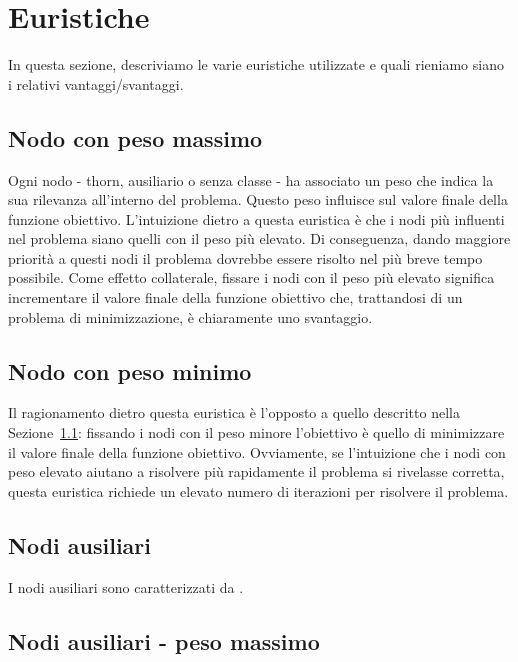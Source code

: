 \section{Euristiche}\label{sec:euristiche}

In questa sezione, descriviamo le varie euristiche utilizzate e quali rieniamo siano i relativi vantaggi/svantaggi.

\subsection{Nodo con peso massimo}\label{subsec:nodo_peso_massimo}

Ogni nodo - thorn, ausiliario o senza classe - ha associato un peso che indica la sua rilevanza all'interno del problema. Questo peso influisce sul valore finale della funzione obiettivo. L'intuizione dietro a questa euristica è che i nodi più influenti nel problema siano quelli con il peso più elevato. Di conseguenza, dando maggiore priorità a questi nodi il problema dovrebbe essere risolto nel più breve tempo possibile. Come effetto collaterale, fissare i nodi con il peso più elevato significa incrementare il valore finale della funzione obiettivo che, trattandosi di un problema di minimizzazione, è chiaramente uno svantaggio.

\subsection{Nodo con peso minimo}\label{subsec:nodo_peso_minimo}

Il ragionamento dietro questa euristica è l'opposto a quello descritto nella Sezione~\ref{subsec:nodo_peso_massimo}: fissando i nodi con il peso minore l'obiettivo è quello di minimizzare il valore finale della funzione obiettivo. Ovviamente, se l'intuizione che i nodi con peso elevato aiutano a risolvere più rapidamente il problema si rivelasse corretta, questa euristica richiede un elevato numero di iterazioni per risolvere il problema.

\subsection{Nodi ausiliari}\label{subsec:nodi_ausiliari}

I nodi ausiliari sono caratterizzati da .

\subsection{Nodi ausiliari - peso massimo}

